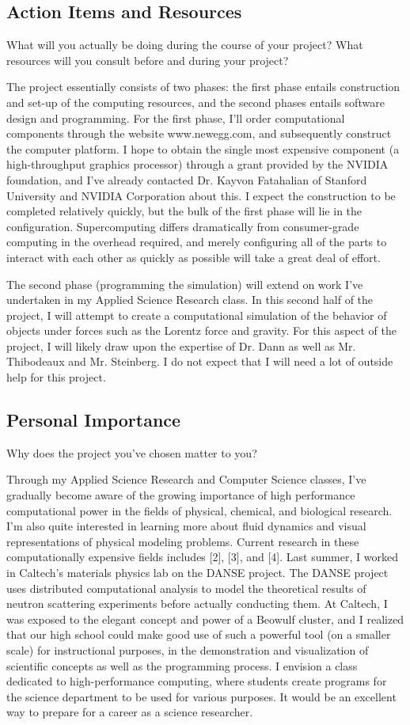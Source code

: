\documentclass[10pt]{article}
\begin{document}
\subsection{Action Items and Resources}
What will you actually be doing during the course of your project? What resources will you consult before and during your project?

The project essentially consists of two phases: the first phase entails construction and set-up of the computing resources, and the second phases entails software design and programming. For the first phase, I'll order computational components through the website www.newegg.com, and subsequently construct the computer platform. I hope to obtain the single most expensive component (a high-throughput graphics processor) through a grant provided by the NVIDIA foundation, and I've already contacted Dr. Kayvon Fatahalian of Stanford University and NVIDIA Corporation about this. I expect the construction to be completed relatively quickly, but the bulk of the first phase will lie in the configuration. Supercomputing differs dramatically from consumer-grade computing in the overhead required, and merely configuring all of the parts to interact with each other as quickly as possible will take a great deal of effort. 

The second phase (programming the simulation) will extend on work I've undertaken in my Applied Science Research class. In this second half of the project, I will attempt to create a computational simulation of the behavior of objects under forces such as the Lorentz force and gravity. For this aspect of the project, I will likely draw upon the expertise of Dr. Dann as well as Mr. Thibodeaux and Mr. Steinberg. I do not expect that I will need a lot of outside help for this project.


\subsection{Personal Importance}
Why does the project you've chosen matter to you?

Through my Applied Science Research and Computer Science classes, I've gradually become aware of the growing importance of high performance computational power in the fields of physical, chemical, and biological research. I'm also quite interested in learning more about fluid dynamics and visual representations of physical modeling problems. Current research in these computationally expensive fields includes [2], [3], and [4]. Last summer, I worked in Caltech's materials physics lab on the DANSE project. The DANSE project uses distributed computational analysis to model the theoretical results of neutron scattering experiments before actually conducting them. At Caltech, I was exposed to the elegant concept and power of a Beowulf cluster, and I realized that our high school could make good use of such a powerful tool (on a smaller scale) for instructional purposes, in the demonstration and visualization of scientific concepts as well as the programming process. I envision a class dedicated to high-performance computing, where students create programs for the science department to be used for various purposes. It would be an excellent way to prepare  for a career as a science researcher.
	
\end{document}
